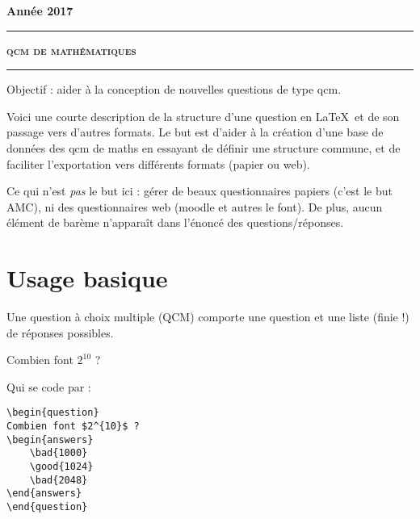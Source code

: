 \documentclass[12pt,a4paper]{article}
\begin{document}
 


\hfill\textbf{Ann\'ee 2017}

\vspace*{0.5ex}
\hrule\vspace*{1.5ex} 
\hfil\textsc{\textbf{\LARGE qcm de mathématiques}}
\vspace*{1ex} \hrule 
\vspace*{5ex} 


Objectif : aider à la conception de nouvelles questions de type qcm.

\bigskip

Voici une courte description de la structure d'une question en \LaTeX\ et de son passage vers d'autres formats. Le but est d'aider à la création d'une base de données des qcm de maths en essayant de définir une structure commune, et de faciliter l'exportation vers différents formats (papier ou web).

\bigskip

Ce qui n'est \emph{pas} le but ici : gérer de beaux questionnaires papiers (c'est le but AMC), ni des questionnaires web (moodle et autres le font). De plus, aucun élément de barème n'apparaît dans l'énoncé des questions/réponses. 



\section{Usage basique}

Une question à choix multiple (QCM) comporte une question et une liste (finie !) de réponses possibles.


\begin{center}
\begin{minipage}{0.8\textwidth}
\begin{question}
Combien font $2^{10}$ ?
\begin{answers}
\end{answers}
\end{question}
\end{minipage}
\end{center}

Qui se code par :
\begin{center}
\begin{minipage}{0.8\textwidth}
\begin{verbatim}
\begin{question}
Combien font $2^{10}$ ?
\begin{answers}
    \bad{1000}
    \good{1024}
    \bad{2048}
\end{answers}
\end{question}
\end{verbatim}
\end{minipage}
\end{center}
\end{document}

